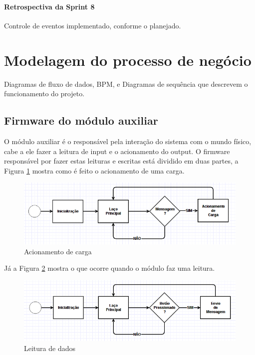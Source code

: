 \paragraph{Retrospectiva da Sprint 8}
Controle de eventos implementado, conforme o planejado.

\section{Modelagem do processo de negócio}
Diagramas de fluxo de dados, BPM, e Diagramas de sequência que descrevem o funcionamento do projeto.

\subsection{Firmware do módulo auxiliar}
O módulo auxiliar é o responsável pela interação do sistema com o mundo físico, cabe a ele fazer a leitura de input e o acionamento do output. O firmware responsável por fazer estas leituras e escritas está dividido em duas partes, a Figura \ref{fw-acionamento} mostra como é feito o acionamento de uma carga.

\begin{figure}[H]
\caption{\label{fw-acionamento} Acionamento de carga}
\includegraphics[scale=0.5]{img/fw-acionamento.png}
\end{figure}

Já a Figura \ref{fw-leitura} mostra o que ocorre quando o módulo faz uma leitura.

\begin{figure}[H]
\caption{\label{fw-leitura} Leitura de dados}
\includegraphics[scale=0.5]{img/fw-leitura.png}
\end{figure}

